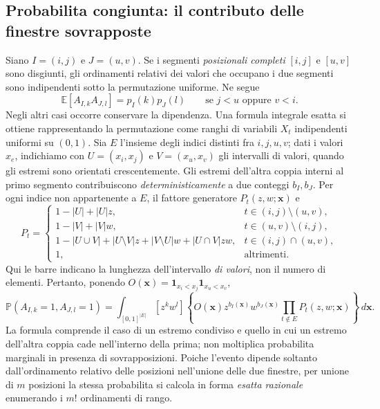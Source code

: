 \documentclass[11pt,a4paper]{article}
\begin{document}
\subsection{Probabilita congiunta: il contributo delle finestre sovrapposte}

Siano $I=(i,j)$ e $J=(u,v)$. Se i segmenti \emph{posizionali completi} $[i,j]$ e $[u,v]$ sono disgiunti, gli ordinamenti relativi dei valori che occupano i due segmenti sono indipendenti sotto la permutazione uniforme. Ne segue
\begin{equation}
\mathbb E[A_{I,k}A_{J,l}]=p_I(k)p_J(l)
\qquad\text{se } j<u\text{ oppure }v<i.
\label{eq:r12ab_disjoint}
\end{equation}
Negli altri casi occorre conservare la dipendenza. Una formula integrale esatta si ottiene rappresentando la permutazione come ranghi di variabili $X_t$ indipendenti uniformi su $(0,1)$. Sia $E$ l'insieme degli indici distinti fra $i,j,u,v$; dati i valori $x_e$, indichiamo con $U=(x_i,x_j)$ e $V=(x_u,x_v)$ gli intervalli di valori, quando gli estremi sono orientati crescentemente. Gli estremi dell'altra coppia interni al primo segmento contribuiscono \emph{deterministicamente} a due conteggi $b_I,b_J$. Per ogni indice non appartenente a $E$, il fattore generatore $P_t(z,w;\mathbf x)$ e
\begin{equation}
P_t=\begin{cases}
1-|U|+|U|z,&t\in(i,j)\setminus(u,v),\\
1-|V|+|V|w,&t\in(u,v)\setminus(i,j),\\
1-|U\cup V|+|U\setminus V|z+|V\setminus U|w+|U\cap V|zw,
&t\in(i,j)\cap(u,v),\\
1,&\text{altrimenti}.
\end{cases}
\label{eq:r12ab_generating_factors}
\end{equation}
Qui le barre indicano la lunghezza dell'intervallo \emph{di valori}, non il numero di elementi. Pertanto, ponendo $O(\mathbf x)=\mathbf1_{x_i<x_j}\mathbf1_{x_u<x_v}$,
\begin{equation}
\boxed{\mathbb P(A_{I,k}=1,A_{J,l}=1)=
\int_{[0,1]^{|E|}}[z^kw^l]\left\{O(\mathbf x)
 z^{b_I(\mathbf x)}w^{b_J(\mathbf x)}
\prod_{t\notin E}P_t(z,w;\mathbf x)\right\}\,d\mathbf x.}
\label{eq:r12ab_exact_joint}
\end{equation}
La formula comprende il caso di un estremo condiviso e quello in cui un estremo dell'altra coppia cade nell'interno della prima; non moltiplica probabilita marginali in presenza di sovrapposizioni. Poiche l'evento dipende soltanto dall'ordinamento relativo delle posizioni nell'unione delle due finestre, per unione di $m$ posizioni la stessa probabilita si calcola in forma \emph{esatta razionale} enumerando i $m!$ ordinamenti di rango.
\end{document}
